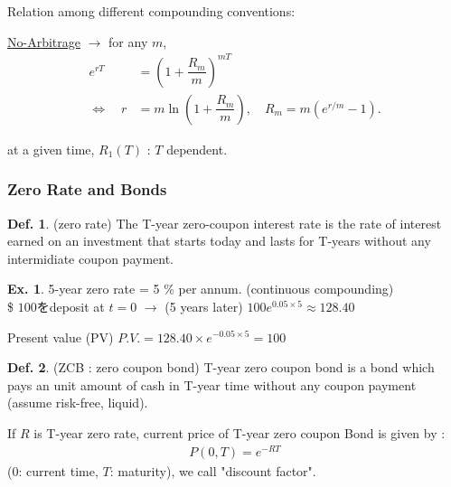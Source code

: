 \documentclass[a4paper,11pt]{jsarticle}
\theoremstyle{definition}
\newtheorem{definition}{Def.}[subsection]
\newtheorem{ex}{Ex.}[subsection]
\newcommand{\df}[2]{\dfrac{#1}{#2}}
\begin{document}
Relation among different compounding conventions:

\underline{No-Arbitrage}
\quad $\to$ for any $m$, 
\begin{align}
  e^{rT}&=\left(1+\df{R_m}{m}\right)^{mT} \\
  \Leftrightarrow \quad r&=m \ln\left(1+\df{R_m}{m}\right),
  \quad R_m=m(e^{r/m}-1).
\end{align}

at a given time, $R_1(T)$ : $T$ dependent. 


\subsubsection{Zero Rate and Bonds}
\begin{definition}{(zero rate)}
The T-year zero-coupon interest rate is the rate of interest 
earned on an investment that starts today and lasts for T-years
without any intermidiate coupon payment.
\end{definition}

\begin{ex}
  5-year zero rate = 5 \% per annum. (continuous compounding)\\
  \$ $100$をdeposit at $t=0$ $\to$ (5 years later) 
  $100e^{0.05\times 5} \approx 128.40 $
\end{ex}

Present value (PV) \quad
$P.V.=128.40 \times e^{-0.05\times 5} = 100 $

\begin{definition}{(ZCB : zero coupon bond)}
  T-year zero coupon bond is a bond which pays an unit amount
  of cash in T-year time without any coupon payment
  (assume risk-free, liquid).
\end{definition}

If $R$ is T-year zero rate, 
current price of T-year zero coupon Bond is given by :
\begin{align}
  P(0,T)=e^{-RT}
\end{align}
($0$: current time, $T$: maturity), \quad
we call "discount factor".
\end{document}
